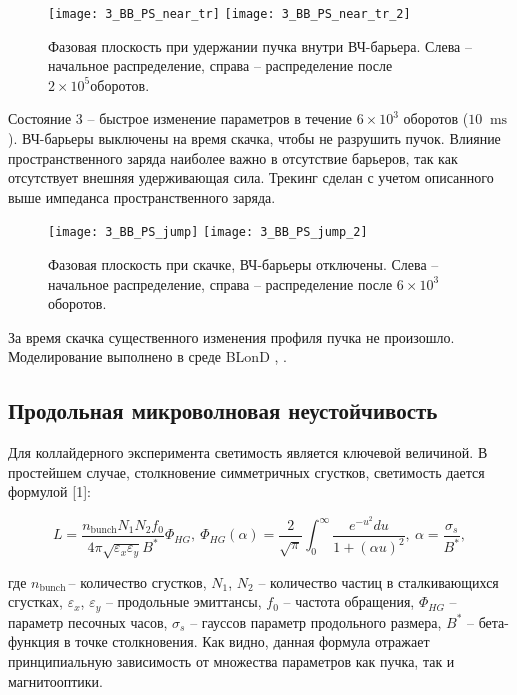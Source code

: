 \begin{figure}
   \texttt{[image: 3\_BB\_PS\_near\_tr]}
   \texttt{[image: 3\_BB\_PS\_near\_tr\_2]}
   \caption{Фазовая плоскость при удержании пучка внутри ВЧ-барьера. Слева – начальное распределение, справа – распределение после $2\times{10}^5 оборотов$.}
   \label{fig:2}
\end{figure}

\par Состояние 3 – быстрое изменение параметров в течение $6\times{10}^3$ о\-бо\-ро\-тов ($10~\text{ ms}$). ВЧ-барьеры выключены на время скачка, чтобы не разрушить пучок. Влияние пространственного заряда наиболее важно в отсутствие барь\-е\-ров, так как отсутствует внешняя удерживающая сила. Трекинг сделан с учетом описанного выше импеданса пространственного заряда.

\begin{figure}[!h]
   \texttt{[image: 3\_BB\_PS\_jump]}
   \texttt{[image: 3\_BB\_PS\_jump\_2]}
   \caption{Фазовая плоскость при скачке, ВЧ-барьеры отключены. Слева – начальное распределение, справа – распределение после $6\times{10}^3$ оборотов.}
   \label{fig:3}
\end{figure}

\par За время скачка существенного изменения профиля пучка не про\-и\-зош\-ло. Моделирование выполнено в среде BLonD \cite{blond1}, \cite{blond}.


\subsection{Продольная микроволновая неустойчивость}\label{sec:transition_jump/microwave_instab}

\par Для коллайдерного эксперимента светимость является ключевой величиной. В простейшем случае, столкновение симметричных сгустков, светимость дается формулой [1]:

\begin{equation}
L=\frac{n_{\mathrm{bunch}}N_1N_2f_0}{4\pi\sqrt{\varepsilon_x\varepsilon_y}B^\ast}\Phi_{HG}, \
\Phi_{HG}(\alpha)=\frac{2}{\sqrt\pi}\int_{0}^{\infty}\frac{e^{-u^2}du}{1+(\alpha u)^2},\
\alpha=\frac{\sigma_s}{B^\ast},
\label{eq:luminocity}
\end{equation}

\noindent где $n_{\mathrm{bunch\ }}$– количество сгустков, $N_1$, $N_2$ – количество частиц в сталкивающихся сгустках, $\varepsilon_x$, $\varepsilon_y$ – продольные эмиттансы, $f_0$ – частота обращения, $\Phi_{HG}$ – параметр песочных часов, $\sigma_s$ – гауссов параметр продольного размера, $B^\ast$ – бета-функция в точке столкновения. Как видно, данная формула отражает принципиальную зависимость от множества параметров как пучка, так и магнитооптики.

